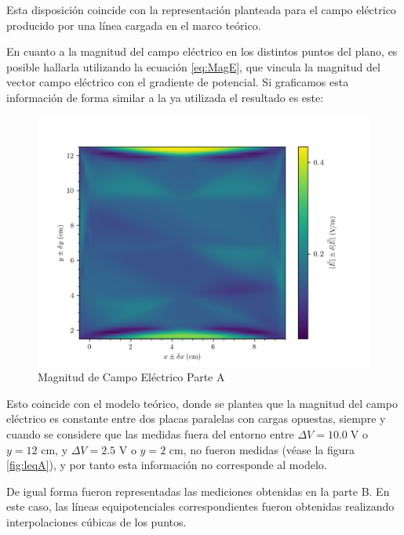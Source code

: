 \documentclass{article}
\begin{document}
Esta disposición coincide con la representación planteada para el campo eléctrico producido por una línea cargada en el marco teórico.

En cuanto a la magnitud del campo eléctrico en los distintos puntos del plano, es posible hallarla utilizando la ecuación \ref{eq:MagE}, que vincula la magnitud del vector campo eléctrico con el gradiente de potencial. Si graficamos esta información de forma similar a la ya utilizada el resultado es este:

\begin{figure}[H]
  \hspace{-0.1cm}\includegraphics[scale=0.12]{plot4.png}
  \caption{Magnitud de Campo Eléctrico Parte A}
\end{figure}

Esto coincide con el modelo teórico, donde se plantea que la magnitud del campo eléctrico es constante entre dos placas paralelas con cargas opuestas, siempre y cuando se considere que las medidas fuera del entorno entre $\Delta V = 10.0 \;\text{V}$ o ${y} = 12$ cm, y $\Delta V = 2.5$ V o $y = 2$ cm, no fueron medidas (véase la figura \ref{fig:leqA}), y por tanto esta información no corresponde al modelo.

De igual forma fueron representadas las mediciones obtenidas en la parte B. En este caso, las líneas equipotenciales correspondientes fueron obtenidas realizando interpolaciones cúbicas de los puntos.

\vfill

\vspace*{-2cm}
\end{document}
